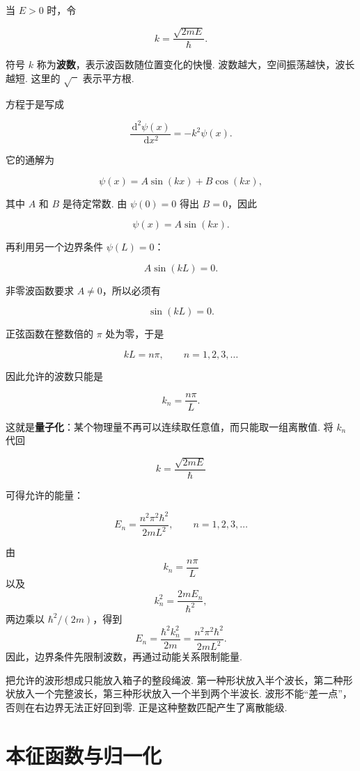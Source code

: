 \documentclass[UTF8,11pt,a4paper,openany]{ctexbook}
\newcommand{\dd}{\,\mathrm d}\newcommand{\Ham}{\hat H}\newcommand{\tr}{\operatorname{Tr}}
\newcommand{\term}[1]{\textbf{#1}}
\begin{document}
当 $E>0$ 时，令

\[
k=\frac{\sqrt{2mE}}{\hbar}.
\]

\begin{notationbox}
符号 $k$ 称为\term{波数}，表示波函数随位置变化的快慢. 波数越大，空间振荡越快，波长越短. 这里的 $\sqrt{\phantom{x}}$ 表示平方根. 
\end{notationbox}

方程于是写成

\[
\frac{\dd^2\psi(x)}{\dd x^2}=-k^2\psi(x).
\]

它的通解为

\[
\psi(x)=A\sin(kx)+B\cos(kx),
\]

其中 $A$ 和 $B$ 是待定常数. 由 $\psi(0)=0$ 得出 $B=0$，因此

\[
\psi(x)=A\sin(kx).
\]

再利用另一个边界条件 $\psi(L)=0$：

\[
A\sin(kL)=0.
\]

非零波函数要求 $A\neq0$，所以必须有

\[
\sin(kL)=0.
\]

正弦函数在整数倍的 $\pi$ 处为零，于是

\[
kL=n\pi,\qquad n=1,2,3,\ldots
\]

因此允许的波数只能是

\[
k_n=\frac{n\pi}{L}.
\]

这就是\term{量子化}：某个物理量不再可以连续取任意值，而只能取一组离散值. 将 $k_n$ 代回

\[
k=\frac{\sqrt{2mE}}{\hbar}
\]

可得允许的能量：

\[
E_n=\frac{n^2\pi^2\hbar^2}{2mL^2},
\qquad n=1,2,3,\ldots
\]

\begin{derivationbox}
由
\[
k_n=\frac{n\pi}{L}
\]
以及
\[
k_n^2=\frac{2mE_n}{\hbar^2},
\]
两边乘以 $\hbar^2/(2m)$，得到
\[
E_n=\frac{\hbar^2k_n^2}{2m}
=\frac{n^2\pi^2\hbar^2}{2mL^2}.
\]
因此，边界条件先限制波数，再通过动能关系限制能量. 
\end{derivationbox}

\begin{analogybox}
把允许的波形想成只能放入箱子的整段绳波. 第一种形状放入半个波长，第二种形状放入一个完整波长，第三种形状放入一个半到两个半波长. 波形不能“差一点”，否则在右边界无法正好回到零. 正是这种整数匹配产生了离散能级. 
\end{analogybox}

\section{本征函数与归一化}
\end{document}
